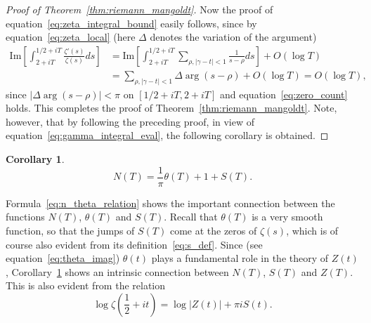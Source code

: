 \documentclass[11pt]{article}
\newtheorem{corollary}[theorem]{Corollary}
\begin{document}
\begin{proof}[Proof of Theorem~\ref{thm:riemann_mangoldt}]
Now the proof of equation~\eqref{eq:zeta_integral_bound} easily follows, since by equation~\eqref{eq:zeta_local} (here $\Delta$ denotes the variation of the argument)
\begin{align}\label{eq:arg_variation}
\text{Im} \left[ \int_{2+iT}^{1/2+iT} \frac{\zeta'(s)}{\zeta(s)} ds \right] &= \text{Im} \left[ \int_{2+iT}^{1/2+iT} \sum_{\rho, |\gamma - t| < 1} \frac{1}{s-\rho} ds \right] + O(\log T) \\
&= \sum_{\rho, |\gamma - t| < 1} \Delta \arg(s-\rho) + O(\log T) = O(\log T), \nonumber
\end{align}
since $|\Delta \arg(s-\rho)| < \pi$ on $[1/2 + iT, 2 + iT]$ and equation~\eqref{eq:zero_count} holds. This completes the proof of Theorem~\ref{thm:riemann_mangoldt}. Note, however, that by following the preceding proof, in view of equation~\eqref{eq:gamma_integral_eval}, the following corollary is obtained.
\end{proof}

\begin{corollary}\label{cor:n_theta}
\begin{equation}\label{eq:n_theta_relation}
N(T) = \frac{1}{\pi} \theta(T) + 1 + S(T).
\end{equation}
\end{corollary}

Formula~\eqref{eq:n_theta_relation} shows the important connection between the functions $N(T)$, $\theta(T)$ and $S(T)$. Recall that $\theta(T)$ is a very smooth function, so that the jumps of $S(T)$ come at the zeros of $\zeta(s)$, which is of course also evident from its definition~\eqref{eq:s_def}. Since (see equation~\eqref{eq:theta_imag}) $\theta(t)$ plays a fundamental role in the theory of $Z(t)$, Corollary~\ref{cor:n_theta} shows an intrinsic connection between $N(T)$, $S(T)$ and $Z(T)$. This is also evident from the relation
\begin{equation}\label{eq:log_zeta_relation}
\log \zeta\left(\frac{1}{2} + it\right) = \log |Z(t)| + \pi i S(t).
\end{equation}
\end{document}
